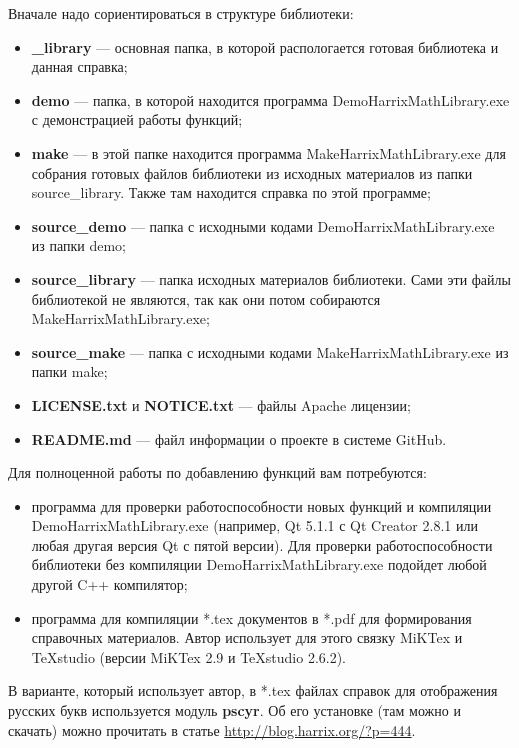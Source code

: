 \documentclass[a4paper,12pt]{article}
\begin{document}
Вначале надо сориентироваться в структуре библиотеки:
\begin{itemize}
\item \textbf{\_library} --- основная папка, в которой распологается готовая библиотека и данная справка;
\item \textbf{demo} --- папка, в которой находится программа DemoHarrixMathLibrary.exe с демонстрацией работы функций;
\item \textbf{make} --- в этой папке находится программа MakeHarrixMathLibrary.exe для собрания готовых файлов библиотеки из исходных материалов из папки source\_library. Также там находится справка по этой программе;
\item \textbf{source\_demo} --- папка с исходными кодами DemoHarrixMathLibrary.exe из папки demo;
\item \textbf{source\_library} --- папка исходных материалов библиотеки. Сами эти файлы библиотекой не являются, так как они потом собираются MakeHarrixMathLibrary.exe; 
\item \textbf{source\_make} --- папка с исходными кодами MakeHarrixMathLibrary.exe из папки make;
\item \textbf{LICENSE.txt} и \textbf{NOTICE.txt} --- файлы Apache лицензии;
\item \textbf{README.md} --- файл информации о проекте в системе GitHub.
\end{itemize}

Для полноценной работы по добавлению функций вам потребуются:
\begin{itemize}
\item программа для проверки работоспособности новых функций и компиляции DemoHarrixMathLibrary.exe (например, Qt 5.1.1 с Qt Creator 2.8.1 или любая другая версия Qt с пятой версии). Для проверки работоспособности библиотеки без компиляции DemoHarrixMathLibrary.exe подойдет любой другой C++ компилятор;
\item программа для компиляции *.tex документов в *.pdf для формирования справочных материалов. Автор использует для этого связку MiKTex и TeXstudio (версии MiKTex 2.9 и TeXstudio 2.6.2).
\end{itemize}

В варианте, который использует автор, в *.tex файлах справок для отображения русских букв используется модуль \textbf{pscyr}. Об его установке (там можно и скачать) можно прочитать в статье \href{http://blog.harrix.org/?p=444}{http://blog.harrix.org/?p=444}.
\end{document}
